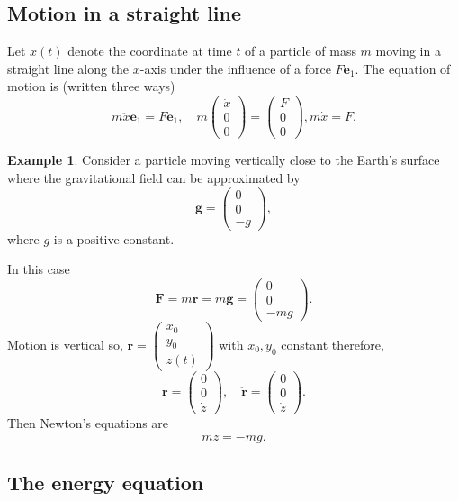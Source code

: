 \documentclass[12pt, a4paper]{article}
\theoremstyle{definition}
\newtheorem*{example}{Example}
\theoremstyle{plain}
\begin{document}
\subsection{Motion in a straight line}

Let $x(t)$ denote the coordinate at time $t$ of a particle of mass $m$ moving in a straight line along the $x$-axis under the influence of a force $F\bm{e}_1$. The equation of motion is (written three ways) $$m\ddot{x}\bm{e}_1=F\bm{e}_1, \quad m \begin{pmatrix} \dot{x} \\ 0 \\ 0 \end{pmatrix} = \begin{pmatrix} F \\0 \\0  \end{pmatrix}, m\dot{x} =F.$$

\begin{example}
Consider a particle moving vertically close to the Earth’s surface where the gravitational field can be approximated by $$\bm{g}=\begin{pmatrix} 0 \\ 0 \\ -g \end{pmatrix},$$ where $g$ is a positive constant.

In this case $$\bm{F}=m\ddot{\bm{r}} = m\bm{g} = \begin{pmatrix}0 \\ 0 \\ -mg  \end{pmatrix}.$$ Motion is vertical so, $\bm{r}=\begin{pmatrix} x_0 \\ y_0 \\ z(t)\end{pmatrix}$ with $x_0,y_0$ constant therefore, $$\dot{\bm{r}}=\begin{pmatrix} 0 \\ 0\\ \dot{z} \end{pmatrix}, \quad \ddot{\bm{r}} =\begin{pmatrix} 0\\0\\\dot{z} \end{pmatrix}.$$ Then Newton's equations are $$m\ddot{z}=-mg.$$
\end{example}

\subsection{The energy equation}
\end{document}

